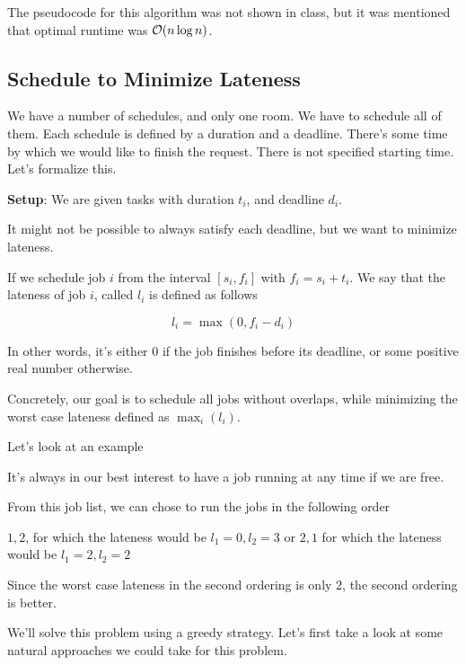 \documentclass[12pt]{article}
\begin{document}
  The pseudocode for this algorithm was not shown in class, but it was mentioned
  that optimal runtime was $\mathcal O(n \log n)$.



  \subsection{Schedule to Minimize Lateness}

  We have a number of schedules, and only one room. We have to schedule all of
  them. Each schedule is defined by a duration and a deadline. There's some
  time by which we would like to finish the request. There is not specified
  starting time. Let's formalize this.

  {\bf Setup}: We are given tasks with duration $t_i$, and deadline $d_i$.

  It might not be possible to always satisfy each deadline, but we want to
  minimize lateness.

  If we schedule job $i$ from the interval $[s_i, f_i]$ with $f_i = s_i + t_i$.
  We say that the lateness of job $i$, called $l_i$ is defined as follows

  \[
    l_i = \max(0, f_i - d_i)
  \]

  In other words, it's either $0$ if the job finishes before its deadline, or
  some positive real number otherwise.

  Concretely, our goal is to schedule all jobs without overlaps, while
  minimizing the worst case lateness defined as $\max_i(l_i)$.


  Let's look at an example

  {
    It's always in our best interest to have a job running at any time if we are
    free.

    From this job list, we can chose to run the jobs in the following order

    $1, 2$, for which the lateness would be $l_1 = 0, l_2 = 3$
    or $2, 1$ for which the lateness would be $l_1 = 2, l_2 = 2$

    Since the worst case lateness in the second ordering is only $2$, the second
    ordering is better.
  }

  We'll solve this problem using a greedy strategy. Let's first take a look at
  some natural approaches we could take for this problem.
\end{document}
